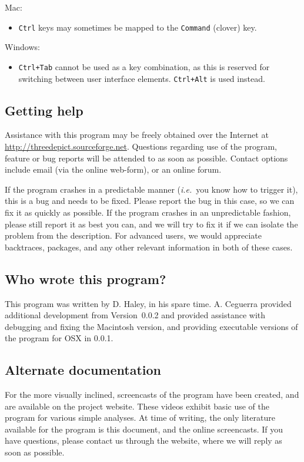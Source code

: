\documentclass[10pt]{article}
\begin{document}
Mac:
\begin{itemize}
 \item \texttt{Ctrl} keys may sometimes be mapped to the \texttt{Command} (clover) key.
\end{itemize}

Windows:
\begin{itemize}
 \item \texttt{Ctrl+Tab} cannot be used as a key combination, as this is reserved for switching between user interface elements. \texttt{Ctrl+Alt} is used instead.
\end{itemize}

 
\subsection{Getting help}

Assistance with this program may be freely obtained over the Internet at \url{http://threedepict.sourceforge.net}. Questions regarding use of the program, feature or bug reports will be attended to as soon as possible. Contact options include email (via the online web-form), or an online forum.

If the program crashes in a predictable manner (\emph{i.e.}\ you know how to trigger it), this is a bug and needs to be fixed. Please report the bug in this case, so we can fix it as quickly as possible. If the program crashes in an unpredictable fashion, please still report it as best you can, and we will try to fix it if we can isolate the problem from the description. For advanced users, we would appreciate backtraces, packages,  and any other relevant information in both of these cases.

\subsection{Who wrote this program?}

This program was written by D. Haley, in his spare time. A. Ceguerra provided  additional development from Version~0.0.2 and provided assistance with debugging and fixing the Macintosh version, and providing executable versions of the program for OSX in 0.0.1. 

\subsection{Alternate documentation}
For the more visually inclined, screencasts of the program have been created, and are available on the project website. These videos exhibit basic use of the program for various simple analyses. At time of writing, the only literature available for the program is this document, and the online screencasts. If you have questions, please contact us through the website, where we will reply as soon as possible. 
\end{document}
